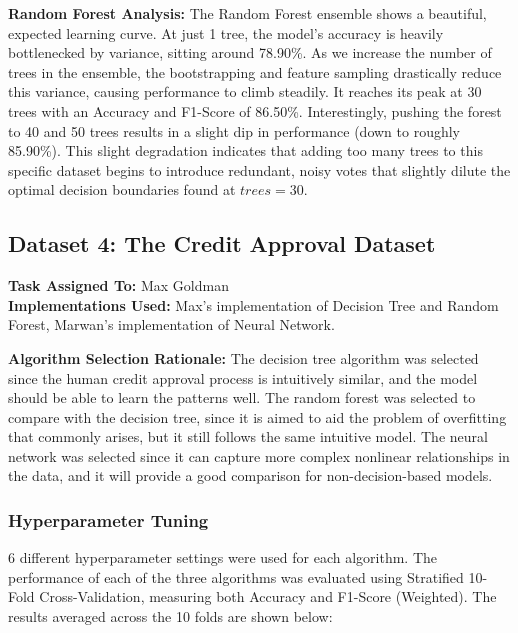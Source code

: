 \documentclass{article}
\begin{document}
\noindent \textbf{Random Forest Analysis:}
The Random Forest ensemble shows a beautiful, expected learning curve. At just 1 tree, the model's accuracy is heavily bottlenecked by variance, sitting around 78.90\%. As we increase the number of trees in the ensemble, the bootstrapping and feature sampling drastically reduce this variance, causing performance to climb steadily. It reaches its peak at 30 trees with an Accuracy and F1-Score of 86.50\%. Interestingly, pushing the forest to 40 and 50 trees results in a slight dip in performance (down to roughly 85.90\%). This slight degradation indicates that adding too many trees to this specific dataset begins to introduce redundant, noisy votes that slightly dilute the optimal decision boundaries found at $trees=30$.

\newpage




\subsection{Dataset 4: The Credit Approval Dataset}

\textbf{Task Assigned To:} Max Goldman \\
\textbf{Implementations Used:} Max's implementation of Decision Tree and Random Forest, Marwan's implementation of Neural Network.

\noindent\textbf{Algorithm Selection Rationale:}
The decision tree algorithm was selected since the human credit approval process is intuitively similar, and the model should be able to learn the patterns well.
The random forest was selected to compare with the decision tree, since it is aimed to aid the problem of overfitting that commonly arises, but it still follows the same intuitive model.
The neural network was selected since it can capture more complex nonlinear relationships in the data, and it will provide a good comparison for non-decision-based models.

\subsubsection{Hyperparameter Tuning}

6 different hyperparameter settings were used for each algorithm. The performance of each of the three algorithms was evaluated using Stratified 10-Fold Cross-Validation, measuring both Accuracy and F1-Score (Weighted). 
The results averaged across the 10 folds are shown below:

\vspace{0.25cm}
\end{document}
